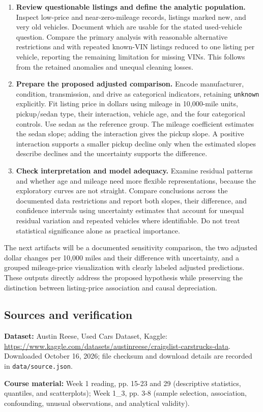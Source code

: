 \documentclass[10pt,letterpaper]{article}
\begin{document}
\begin{enumerate}

\item \textbf{Review questionable listings and define the analytic population.} Inspect low-price and near-zero-mileage records, listings marked new, and very old vehicles. Document which are usable for the stated used-vehicle question. Compare the primary analysis with reasonable alternative restrictions and with repeated known-VIN listings reduced to one listing per vehicle, reporting the remaining limitation for missing VINs. This follows from the retained anomalies and unequal cleaning losses.

\item \textbf{Prepare the proposed adjusted comparison.} Encode manufacturer, condition, transmission, and drive as categorical indicators, retaining \texttt{unknown} explicitly. Fit listing price in dollars using mileage in 10,000-mile units, pickup/sedan type, their interaction, vehicle age, and the four categorical controls. Use sedan as the reference group. The mileage coefficient estimates the sedan slope; adding the interaction gives the pickup slope. A positive interaction supports a smaller pickup decline only when the estimated slopes describe declines and the uncertainty supports the difference.

\item \textbf{Check interpretation and model adequacy.} Examine residual patterns and whether age and mileage need more flexible representations, because the exploratory curves are not straight. Compare conclusions across the documented data restrictions and report both slopes, their difference, and confidence intervals using uncertainty estimates that account for unequal residual variation and repeated vehicles where identifiable. Do not treat statistical significance alone as practical importance.

\end{enumerate}

The next artifacts will be a documented sensitivity comparison, the two adjusted dollar changes per 10,000 miles and their difference with uncertainty, and a grouped mileage-price visualization with clearly labeled adjusted predictions. These outputs directly address the proposed hypothesis while preserving the distinction between listing-price association and causal depreciation.

\newpage

\subsection*{Sources and verification}

\textbf{Dataset:} Austin Reese, Used Cars Dataset, Kaggle: \newline\url{https://www.kaggle.com/datasets/austinreese/craigslist-carstrucks-data}. Downloaded October 16, 2026; file checksum and download details are recorded in \texttt{data/source.json}.

\textbf{Course material:} Week 1 reading, pp. 15-23 and 29 (descriptive statistics, quantiles, and scatterplots); Week 1\_3, pp. 3-8 (sample selection, association, confounding, unusual observations, and analytical validity).
\end{document}
